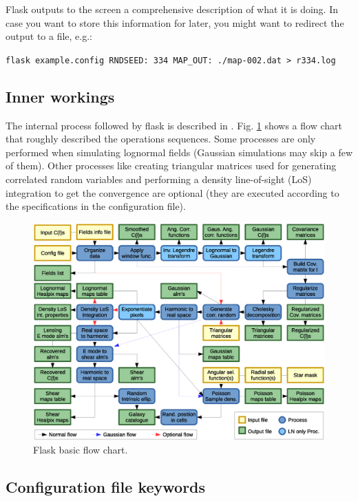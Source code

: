 \documentclass[12pt]{book} %
\begin{document}
{\sc Flask} outputs to the screen a comprehensive description of what it is doing. In case you want to 
store this information for later, you might want to redirect the output to a file, e.g.: 

\vspace{0.5cm}
\noindent
{\tt flask example.config RNDSEED: 334 MAP\_OUT: ./map-002.dat > r334.log}
\vspace{0.5cm}

\subsection{Inner workings}
\label{sec:workings}

The internal process followed by {\sc flask} is described in \citet{Xavier16mn}. 
Fig. \ref{fig:flow-chart} shows a flow chart that roughly described the 
operations sequences. Some processes are only performed when simulating lognormal 
fields (Gaussian simulations may skip a few of them). Other processes like 
creating triangular matrices used for generating correlated random variables and 
performing a density line-of-sight (LoS) integration to get the convergence are 
optional (they are executed according to the specifications in the configuration file).

\begin{figure}
  \includegraphics[width=1\textwidth]{flask_flow_chart.eps}
  \caption{{\sc Flask} basic flow chart.}
\label{fig:flow-chart}  
\end{figure}


\subsection{Configuration file keywords}
\label{sec:keywords}
\end{document}
